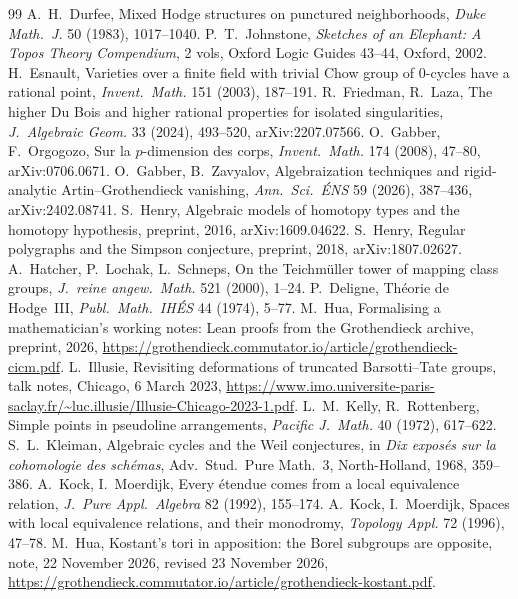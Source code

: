 \documentclass[11pt]{article}
\theoremstyle{definition}
\theoremstyle{plain}\newtheorem*{proposition}{Proposition}\theoremstyle{definition}
\begin{document}
\begin{thebibliography}{99}
 A.~H.~Durfee, Mixed Hodge structures on punctured neighborhoods, \emph{Duke Math.\ J.} 50 (1983), 1017--1040.
 P.~T.~Johnstone, \emph{Sketches of an Elephant: A Topos Theory Compendium}, 2 vols, Oxford Logic Guides 43--44, Oxford, 2002.
 H.~Esnault, Varieties over a finite field with trivial Chow group of 0-cycles have a rational point, \emph{Invent.\ Math.} 151 (2003), 187--191.
 R.~Friedman, R.~Laza, The higher Du Bois and higher rational properties for isolated singularities, \emph{J.\ Algebraic Geom.} 33 (2024), 493--520, arXiv:2207.07566.
 O.~Gabber, F.~Orgogozo, Sur la $p$-dimension des corps, \emph{Invent.\ Math.} 174 (2008), 47--80, arXiv:0706.0671.
 O.~Gabber, B.~Zavyalov, Algebraization techniques and rigid-analytic Artin--Grothendieck vanishing, \emph{Ann.\ Sci.\ ÉNS} 59 (2026), 387--436, arXiv:2402.08741.
 S.~Henry, Algebraic models of homotopy types and the homotopy hypothesis, preprint, 2016, arXiv:1609.04622.
 S.~Henry, Regular polygraphs and the Simpson conjecture, preprint, 2018, arXiv:1807.02627.
 A.~Hatcher, P.~Lochak, L.~Schneps, On the Teichmüller tower of mapping class groups, \emph{J.\ reine angew.\ Math.} 521 (2000), 1--24.
 P.~Deligne, Théorie de Hodge~III, \emph{Publ.\ Math.\ IHÉS} 44 (1974), 5--77.
 M.~Hua, Formalising a mathematician's working notes: Lean proofs from the Grothendieck archive, preprint, 2026, \url{https://grothendieck.commutator.io/article/grothendieck-cicm.pdf}.
 L.~Illusie, Revisiting deformations of truncated Barsotti--Tate groups, talk notes, Chicago, 6 March 2023, \url{https://www.imo.universite-paris-saclay.fr/~luc.illusie/Illusie-Chicago-2023-1.pdf}.
 L.~M.~Kelly, R.~Rottenberg, Simple points in pseudoline arrangements, \emph{Pacific J.\ Math.} 40 (1972), 617--622.
 S.~L.~Kleiman, Algebraic cycles and the Weil conjectures, in \emph{Dix exposés sur la cohomologie des schémas}, Adv.\ Stud.\ Pure Math.~3, North-Holland, 1968, 359--386.
 A.~Kock, I.~Moerdijk, Every étendue comes from a local equivalence relation, \emph{J.\ Pure Appl.\ Algebra} 82 (1992), 155--174.
 A.~Kock, I.~Moerdijk, Spaces with local equivalence relations, and their monodromy, \emph{Topology Appl.} 72 (1996), 47--78.
 M.~Hua, Kostant's tori in apposition: the Borel subgroups are opposite, note, 22 November 2026, revised 23 November 2026, \url{https://grothendieck.commutator.io/article/grothendieck-kostant.pdf}.

\end{thebibliography}
\end{document}
